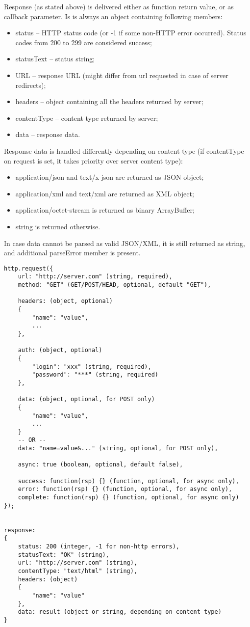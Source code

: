 Response (as stated above) is delivered either as function return value, or as callback 
parameter. Is is always an object containing following members:

\begin{itemize}
\item status – HTTP status code (or -1 if some non-HTTP error occurred). Status codes 
from 200 to 299 are considered success;
\item statusText – status string;
\item URL – response URL (might differ from url requested in case of server redirects);
\item headers – object containing all the headers returned by server;
\item contentType – content type returned by server;
\item data – response data.
\end{itemize}


Response data is handled differently depending on content type (if contentType on request is set, it takes priority over server content type):
\begin{itemize}
\item application/json and text/x-json are returned as JSON object;
\item application/xml and text/xml are returned as XML object;
\item application/octet-stream is returned as binary ArrayBuffer;
\item string is returned otherwise.
\end{itemize}
In case data cannot be parsed as valid JSON/XML, it is still returned as string, and additional parseError member is present.


\begin{lstlisting}
http.request({
	url: "http://server.com" (string, required),
	method: "GET" (GET/POST/HEAD, optional, default "GET"),
	
	headers: (object, optional)
	{
		"name": "value",
		...
	},
	
	auth: (object, optional)
	{
		"login": "xxx" (string, required),
		"password": "***" (string, required)
	},
	
	data: (object, optional, for POST only)
	{
		"name": "value",
		...
	}
	-- OR --
	data: "name=value&..." (string, optional, for POST only),

	async: true (boolean, optional, default false),
	
	success: function(rsp) {} (function, optional, for async only),
	error: function(rsp) {} (function, optional, for async only),
	complete: function(rsp) {} (function, optional, for async only)
});


response:
{
	status: 200 (integer, -1 for non-http errors),
	statusText: "OK" (string),
	url: "http://server.com" (string),
	contentType: "text/html" (string),
	headers: (object)
	{
		"name": "value"
	},
	data: result (object or string, depending on content type)
}
\end{lstlisting}

